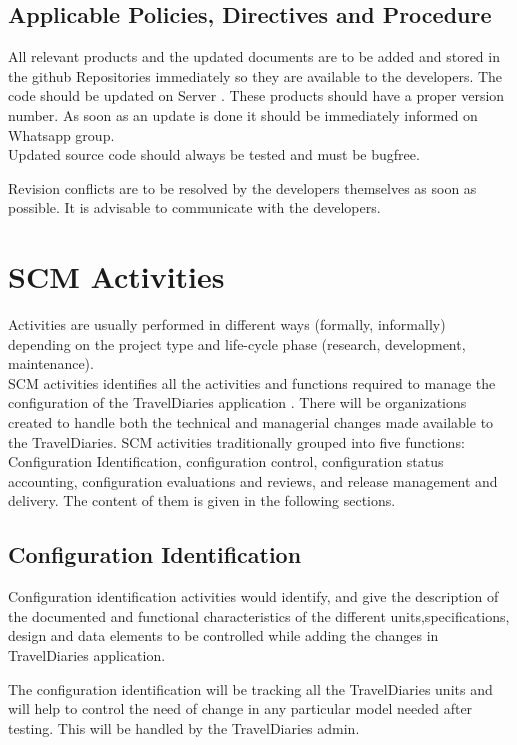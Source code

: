 \documentclass[]{article}
\begin{document}
\subsection{Applicable Policies, Directives and Procedure}
All relevant products and the updated documents are to be added and stored in the github Repositories immediately so they are available to the developers. The code should be updated on Server . These products should have a proper version number. As soon as an update is done it should be immediately informed on Whatsapp group.\\


Updated source code should always be tested and must be bug­free.
 
Revision conflicts are to be resolved by the developers themselves as soon as possible. It is advisable to communicate with the developers.

\section{SCM Activities}
Activities are usually performed in different ways (formally, informally)
depending on the project type and life-cycle phase (research,
development, maintenance).\\
SCM activities identifies all the activities and functions required to manage the configuration of the TravelDiaries application . There will be organizations created to handle both the technical and managerial changes made available to the TravelDiaries. SCM activities traditionally grouped into five functions: Configuration Identification, configuration control, configuration status accounting, configuration evaluations and reviews, and release management and delivery. The content of them is given in the following sections.

\subsection{Configuration Identification}
Configuration identification activities would identify, and give the description of the documented and functional characteristics of the different units,specifications, design and data elements to be controlled while adding the changes in TravelDiaries application.


The configuration identification will be tracking all the TravelDiaries units and will help to control the need of change in any particular model needed after testing. This will be handled by the TravelDiaries admin.
\end{document}
